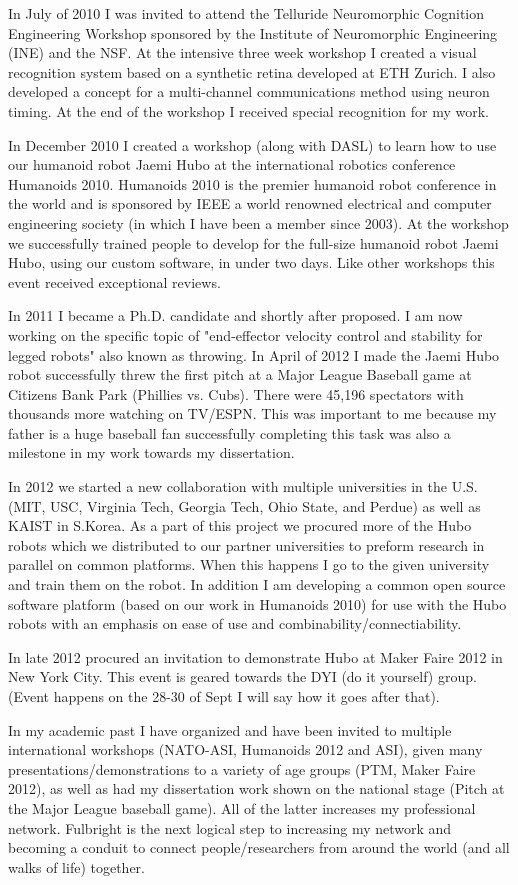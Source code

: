 \documentclass[12pt]{article}
\begin{document}
In July of 2010 I was invited to attend the Telluride Neuromorphic Cognition Engineering Workshop sponsored by the Institute of Neuromorphic Engineering (INE) and the NSF.  At the intensive three week workshop I created a visual recognition system based on a synthetic retina developed at ETH Zurich.  I also developed a concept for a multi-channel communications method using neuron timing.  At the end of the workshop I received special recognition for my work.

In December 2010 I created a workshop (along with DASL) to learn how to use our humanoid robot Jaemi Hubo at the international robotics conference Humanoids 2010.  Humanoids 2010 is the premier humanoid robot conference in the world and is sponsored by IEEE a world renowned electrical and computer engineering society (in which I have been a member since 2003).  At the workshop we successfully trained people to develop for the full-size humanoid robot Jaemi Hubo, using our custom software, in under two days.  Like other workshops this event received exceptional reviews.

In 2011 I became a Ph.D. candidate and shortly after proposed.  I am now working on the specific topic of "end-effector velocity control and stability for legged robots" also known as throwing.  In April of 2012 I made the Jaemi Hubo robot successfully threw the first pitch at a Major League Baseball game at Citizens Bank Park (Phillies vs. Cubs).  There were 45,196 spectators with thousands more watching on TV/ESPN.  This was important to me because my father is a huge baseball fan successfully completing this task was also a milestone in my work towards my dissertation.  

In 2012 we started a new collaboration with multiple universities in the U.S. (MIT, USC, Virginia Tech, Georgia Tech, Ohio State, and Perdue) as well as KAIST in S.Korea.  As a part of this project we procured more of the Hubo robots which we distributed to our partner universities to preform research in parallel on common platforms.  When this happens I go to the given university and train them on the robot.  In addition I am developing a common open source software platform (based on our work in Humanoids 2010) for use with the Hubo robots with an emphasis on ease of use and combinability/connectiability.

In late 2012 procured an invitation to demonstrate Hubo at Maker Faire 2012 in New York City.  This event is geared towards the DYI (do it yourself) group. (Event happens on the 28-30 of Sept I will say how it goes after that). 

In my academic past I have organized and have been invited to multiple international workshops (NATO-ASI, Humanoids 2012 and ASI), given many presentations/demonstrations to a variety of age groups (PTM, Maker Faire 2012), as well as had my dissertation work shown on the national stage (Pitch at the Major League baseball game).  All of the latter increases my professional network.  Fulbright is the next logical step to increasing my network and becoming a conduit to connect people/researchers from around the world (and all walks of life) together.
\end{document}
